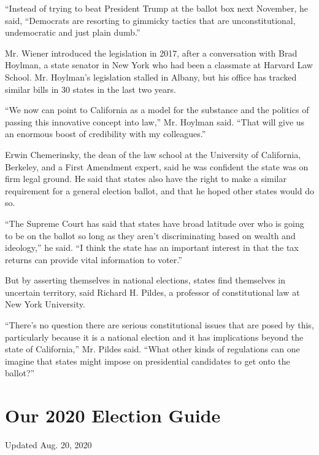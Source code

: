 ``Instead of trying to beat President Trump at the ballot box next
November, he said, ``Democrats are resorting to gimmicky tactics that
are unconstitutional, undemocratic and just plain dumb.''

Mr. Wiener introduced the legislation in 2017, after a conversation with
Brad Hoylman, a state senator in New York who had been a classmate at
Harvard Law School. Mr. Hoylman's legislation stalled in Albany, but his
office has tracked similar bills in 30 states in the last two years.

``We now can point to California as a model for the substance and the
politics of passing this innovative concept into law,'' Mr. Hoylman
said. ``That will give us an enormous boost of credibility with my
colleagues.''

Erwin Chemerinsky, the dean of the law school at the University of
California, Berkeley, and a First Amendment expert, said he was
confident the state was on firm legal ground. He said that states also
have the right to make a similar requirement for a general election
ballot, and that he hoped other states would do so.

``The Supreme Court has said that states have broad latitude over who is
going to be on the ballot so long as they aren't discriminating based on
wealth and ideology,'' he said. ``I think the state has an important
interest in that the tax returns can provide vital information to
voter.''

But by asserting themselves in national elections, states find
themselves in uncertain territory, said Richard H. Pildes, a professor
of constitutional law at New York University.

``There's no question there are serious constitutional issues that are
posed by this, particularly because it is a national election and it has
implications beyond the state of California,'' Mr. Pildes said. ``What
other kinds of regulations can one imagine that states might impose on
presidential candidates to get onto the ballot?''

\hypertarget{our-2020-election-guide}{%
\section{Our 2020 Election Guide}\label{our-2020-election-guide}}

Updated Aug. 20, 2020

